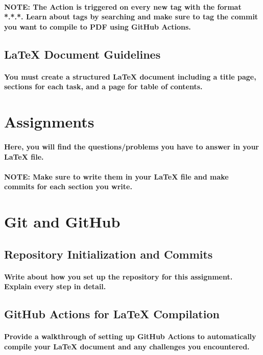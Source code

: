 \documentclass{article}
\begin{document}
\paragraph{\bf{NOTE:} The Action is triggered on every new tag with the format *.*.*. Learn about
tags by searching and make sure to tag the commit you want to compile to PDF using
GitHub Actions.}
\subsection{LaTeX Document Guidelines}
\paragraph{You must create a structured LaTeX document including a title page, sections for each
task, and a page for table of contents.}
\newpage
\section*{Assignments}
\paragraph{Here, you will find the questions/problems you have to answer in your LaTeX file.\\\\
\bf{NOTE:} Make sure to write them in your LaTeX file and make commits for each section
you write.}
\section{Git and GitHub}
\subsection{Repository Initialization and Commits}
\paragraph{Write about how you set up the repository for this assignment. Explain every step in
detail.}
\subsection{GitHub Actions for LaTeX Compilation}
\paragraph{Provide a walkthrough of setting up GitHub Actions to automatically compile your LaTeX
document and any challenges you encountered.}
\end{document}
